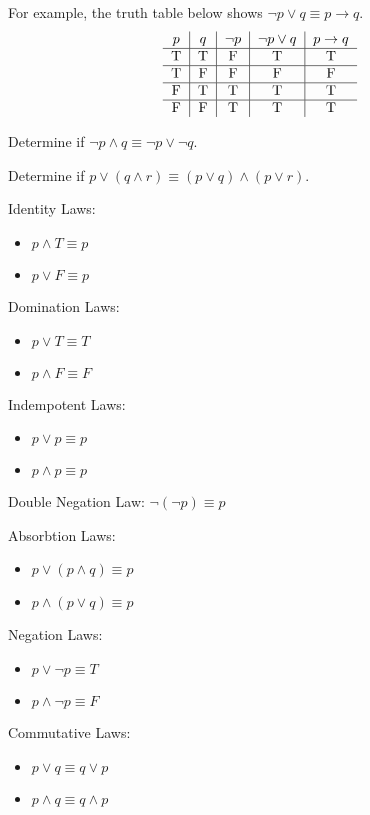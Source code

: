 \documentclass[../discrete.tex]{subfiles}
\begin{document}
For example, the truth table below shows $\neg p\lor q\equiv p\rightarrow q$.
\[ \begin{tabular}{c|c|c|c|c}
    $p$ & $q$ & $\neg p$ & $\neg p\lor q$ & $p\rightarrow q$\\\hline
    T&T&F&T&T\\\hline
    T&F&F&F&F\\\hline
    F&T&T&T&T\\\hline
    F&F&T&T&T
\end{tabular}\]

\ex Determine if $\neg p\land q\equiv \neg p\lor \neg q$.

\ex Determine if $p\lor (q\land r)\equiv (p\lor q)\land (p\lor r)$.

Identity Laws:
\begin{itemize}
    \item $p\land T\equiv p$
    \item $p\lor F\equiv p$
\end{itemize}

Domination Laws:
\begin{itemize}
    \item $p\lor T\equiv T$
    \item $p\land F\equiv F$
\end{itemize}

Indempotent Laws:
\begin{itemize}
    \item $p\lor p\equiv p$
    \item $p\land p\equiv p$
\end{itemize}

Double Negation Law: $\neg(\neg p)\equiv p$

Absorbtion Laws:
\begin{itemize}
    \item $p\lor (p\land q)\equiv p$
    \item $p\land (p\lor q)\equiv p$
\end{itemize}

Negation Laws:
\begin{itemize}
    \item $p\lor \neg p\equiv T$
    \item $p\land \neg p\equiv F$
\end{itemize}

Commutative Laws:
\begin{itemize}
    \item $p\lor q\equiv q\lor p$
    \item $p\land q\equiv q\land p$
\end{itemize}
\end{document}
